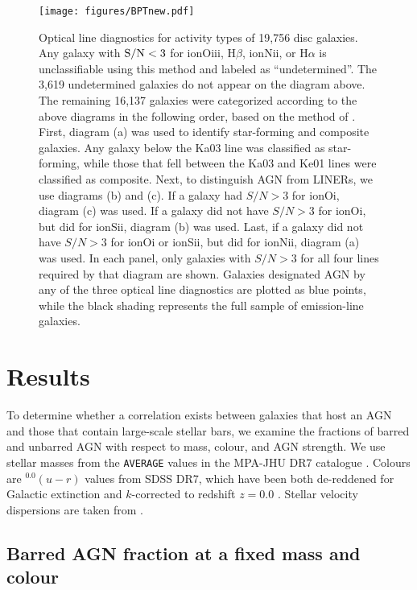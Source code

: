 \begin{figure*}
\texttt{[image: figures/BPTnew.pdf]}
\caption{Optical line diagnostics for activity types of 19,756 disc galaxies. Any galaxy with $\rm S/N < 3$ for ion{O}{iii}, H$\beta$, ion{N}{ii}, or H$\alpha$ is unclassifiable using this method and labeled as ``undetermined''. The 3,619 undetermined galaxies do not appear on the diagram above. The remaining 16,137 galaxies were categorized according to the above diagrams in the following order, based on the method of \citet{Schawinski2007}. First, diagram (a) was used to identify star-forming and composite galaxies. Any galaxy below the Ka03 line was classified as star-forming, while those that fell between the Ka03 and Ke01 lines were classified as composite. Next, to distinguish AGN from LINERs, we use diagrams (b) and (c). If a galaxy had $S/N > 3$ for ion{O}{i}, diagram (c) was used. If a galaxy did not have $S/N > 3$ for ion{O}{i}, but did for ion{S}{ii}, diagram (b) was used. Last, if a galaxy did not have $S/N > 3$ for ion{O}{i} or ion{S}{ii}, but did for ion{N}{ii}, diagram (a) was used. In each panel, only galaxies with $S/N > 3$ for all four lines required by that diagram are shown. Galaxies designated AGN by any of the three optical line diagnostics are plotted as blue points, while the black shading represents the full sample of emission-line galaxies.}
\label{BPT}
\end{figure*}
\section{Results}
\label{sec:Results}

To determine whether a correlation exists between galaxies that host an AGN and those that contain large-scale stellar bars, we examine the fractions of barred and unbarred AGN with respect to mass, colour, and AGN strength. We use stellar masses from the {\tt AVERAGE} values in the MPA-JHU DR7 catalogue \citep{Kauffmann2003}. Colours are $^{0.0}(u-r)$ values from SDSS DR7, which have been both de-reddened for Galactic extinction and $k$-corrected to redshift $z=0.0$ \citep{Csabai2003}. Stellar velocity dispersions are taken from \citet{Oh2011}.

\subsection{Barred AGN fraction at a fixed mass and colour}\label{ssec:barredfraction}
 
